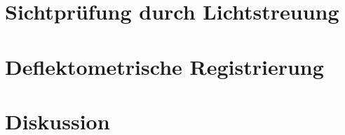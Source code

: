 {
	\FloatBarrier
    \section{Sichtprüfung durch Lichtstreuung}
    \label{sec:ergebnisseSichtpruefungDurchLichtstreuung}
    
}

{
	\FloatBarrier
    \section{Deflektometrische Registrierung}
    \label{sec:ergebnisseDeflektometrischeRegistrierung}
    
}

{
	\FloatBarrier
    \section{Diskussion}
    \label{sec:diskussion}
    
}